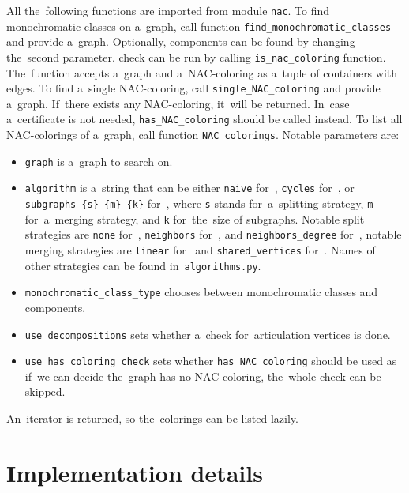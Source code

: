 All the~following functions are imported from module \texttt{nac}.
To find monochromatic classes on a~graph,
call function \texttt{find\_monochromatic\_classes} and provide a~graph.
Optionally, \trcon{} components can be found by changing the~second parameter.
%
\IsNACColoring{} check can be run by calling \texttt{is\_nac\_coloring} function.
The~function accepts a~graph and a~NAC-coloring
as a~tuple of containers with edges.
%
To find a~single NAC-coloring, call \texttt{single\_NAC\_coloring} and provide
a~graph. If~there exists any NAC-coloring, it~will be returned.
In~case a~certificate is not needed,
\texttt{has\_NAC\_coloring} should be called instead.
%
To list all NAC-colorings of a~graph, call function \texttt{NAC\_colorings}.
Notable parameters are:
\begin{itemize}
	\item \texttt{graph} is a~graph to search on.
	\item \texttt{algorithm} is a~string that can be either
	      \texttt{naive} for~\Naive{},
	      \texttt{cycles} for~\NaiveCycles{},
	      or \texttt{subgraphs-\{s\}-\{m\}-\{k\}} for~\Subgraphs{},
	      where \texttt{s} stands for~a~splitting strategy,
	      \texttt{m} for~a~merging strategy,
	      and \texttt{k} for~the~size of subgraphs.
	      Notable split strategies are
	      \texttt{none} for~\None{},
	      \texttt{neighbors} for~\Neighbors{}, and
	      \texttt{neighbors\_degree} for~\NeighborsDegree{},
	      notable merging strategies are
	      \texttt{linear} for~\MergeLinear{} and
	      \texttt{shared\_vertices} for~\SharedVertices{}.
	      Names of other strategies can be found in~\texttt{algorithms.py}.
	\item \texttt{monochromatic\_class\_type} chooses
	      between monochromatic classes and \trcon{} components.
	\item \texttt{use\_decompositions} sets
	      whether a~check for~articulation vertices is done.
	\item \texttt{use\_has\_coloring\_check} sets
	      whether \texttt{has\_NAC\_coloring} should be used
	      as if~we can decide the~graph has no NAC-coloring,
	      the~whole check can be skipped.
\end{itemize}
%
An~iterator is returned, so the~colorings can be listed lazily.


\section{Implementation details}

